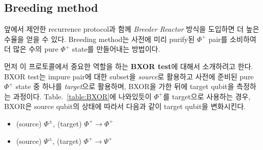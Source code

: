\documentclass[
]{kaohandt}
\begin{document}
\subsection{Breeding method}
앞에서 제안한 recurrence protocol과 함께 \textit{Breeder Reactor} 방식을 도입하면 더 높은 수율을 얻을 수 있다. Breeding method는 사전에 미리 purify된 $\Phi^+$ pair를 소비하여 더 많은 수의 pure $\Phi^+$ state를 만들어내는 방법이다.

먼저 이 프로토콜에서 중요한 역할을 하는 \textbf{BXOR test}에 대해서 소개하려고 한다. BXOR test는 impure pair에 대한 subset을 \textit{source}로 활용하고 사전에 준비된 pure $\Phi^+$ state 중 하나를 \textit{target}으로 활용하며, BXOR을 가한 뒤에 target qubit을 측정하는 과정이다. Table.~\ref{table:BXOR}에 나와있듯이 $\Phi^+$를 target으로 사용하는 경우, BXOR은 source qubit의 상태에 따라서 다음과 같이 target qubit을 변화시킨다.
\begin{itemize}
    \item (source) $\Phi^{\pm}$, (target) $\Phi^{+} \rightarrow \Phi^{+}$
    \item (source) $\Psi^{\pm}$, (target) $\Phi^{+} \rightarrow \Psi^{+}$
\end{itemize}
\end{document}
